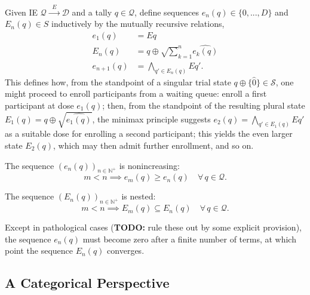 \documentclass{article}
\newcommand{\N}{\mathbb{N}}
\begin{document}
\begin{nota}\label{mutrec}
  Given IE $\mathcal{Q} \xrightarrow{\;\;E\;\;} \mathcal{D}$ and a tally $q \in \mathcal{Q}$, define sequences $e_n(q) \in \{0,...,D\}$ and $E_n(q) \in S$ inductively by the mutually recursive relations,
  $$
  \begin{aligned}
    e_1(q) &= E q \\
    E_n(q) &= q \oplus \surd \sum_{k=1}^n \widehat{e_k(q)} \\
    e_{n+1}(q) &= \bigwedge_{q' \in E_n(q)} E q'.
  \end{aligned}
  $$
This defines how, from the standpoint of a singular trial state $q \oplus \{\widehat{0}\} \in \mathcal{S}$, one might proceed to enroll participants from a waiting queue: enroll a first participant at dose $e_1(q)$; then, from the standpoint of the resulting plural state $E_1(q) = q \oplus \surd\widehat{e_1(q)}$, the minimax principle suggests $e_2(q) = \bigwedge_{q' \in E_1(q)} E q'$ as a suitable dose for enrolling a second participant; this yields the even larger state $E_2(q)$, which may then admit further enrollment, and so on.
\end{nota}

\begin{fact}
  The sequence $(e_n(q))_{n \in \N^+}$ is nonincreasing:
  $$
  m < n \implies e_m(q) \ge e_n(q) \quad \forall\, q \in \mathcal{Q}.
  $$
\end{fact}

\begin{fact}
  The sequence $(E_n(q))_{n \in \N^+}$ is nested:
  $$
  m < n \implies E_m(q) \subseteq E_n(q) \quad \forall\, q \in \mathcal{Q}.
  $$
\end{fact}

Except in pathological cases (\textbf{TODO:} rule these out by some explicit provision), the sequence $e_n(q)$ must become zero after a finite number of terms, at which point the sequence $E_n(q)$ converges.

\subsection{A Categorical Perspective}
\end{document}
